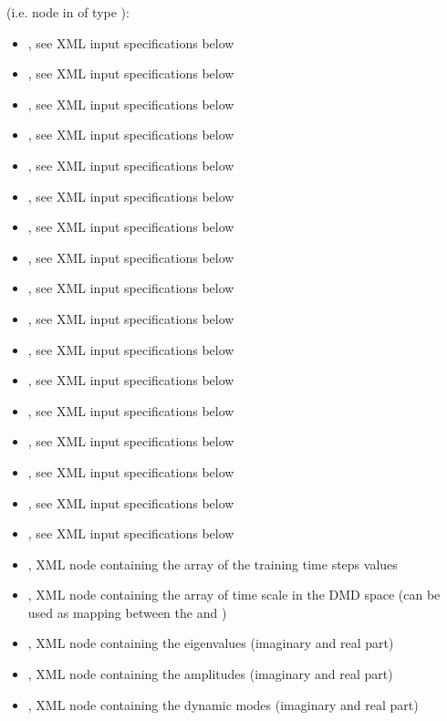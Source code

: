   (i.e.  node     in  of type ):     \begin{itemize}
  \item {}, see XML input specifications below       \item {},
  see XML input specifications below       \item {}, see XML input specifications below
  \item {}, see XML input specifications below       \item {}, see
  XML input specifications below       \item {}, see XML input
  specifications below       \item {}, see XML input specifications below
  \item {}, see XML input specifications below       \item
  , see XML input specifications below       \item
  , see XML input specifications below       \item {}, see XML
  input specifications below       \item {}, see XML input specifications below
  \item {}, see XML input specifications below       \item {},
  see XML input specifications below       \item {}, see XML input
  specifications below       \item {}, see XML input specifications
  below       \item {}, see XML input specifications below       \item
  , XML node containing the array of the training time steps values       \item
  , XML node containing the array of time scale in the DMD space (can be used
  as mapping       between the   and )       \item
  , XML node containing the eigenvalues (imaginary and real part)       \item
  , XML node containing the amplitudes (imaginary and real part)       \item
  , XML node containing the dynamic modes (imaginary and real part)     \end{itemize}

